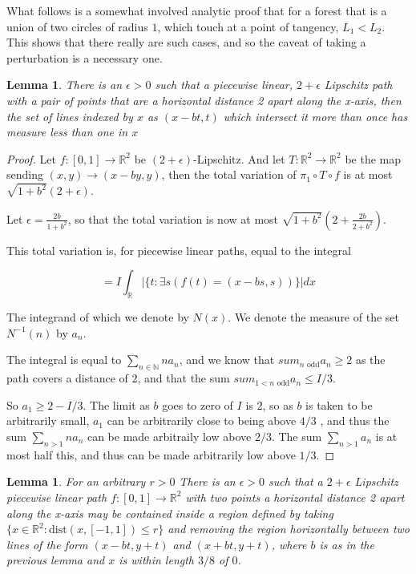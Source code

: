 \documentclass[10pt,a4paper]{article}
\newtheorem{lem}[thm]{Lemma}          %
\theoremstyle{definition}
\newcommand{\N}{\mathbb{N}}
\def\R{\mathbb{R}}
\begin{document}
What follows is a somewhat involved analytic proof that for a forest that is a union of two circles of radius $1$, which touch at a point of tangency, $L_1 < L_2$. This shows that there really are such cases, and so the caveat of taking a perturbation is a necessary one.

\begin{lem}
There is an $\epsilon > 0$ such that a piecewise linear, $2+\epsilon$ Lipschitz path with a pair of points that are a horizontal distance 2 apart along the x-axis, then the set of lines indexed by $x$ as $(x-bt,t)$ which intersect it more than once has measure less than one in $x$
\end{lem}
\label{lem:linebound}

\begin{proof}
    Let $f:[0,1]\rightarrow \R^2$ be $(2+\epsilon)$-Lipschitz. And let $T:\R^2\rightarrow \R^2$ be the map sending $(x,y)\rightarrow (x-by,y)$, then the total variation of $\pi_1\circ T\circ f$ is at most $\sqrt{1+b^2}(2+\epsilon)$.

Let $\epsilon = \frac{2b}{1+b^2}$, so that the total variation is now at most $\sqrt{1+b^2}(2+\frac{2b}{2+b^2})$.

This total variation is, for piecewise linear paths, equal to the integral

$$= I \int_\R |\{t:\exists s (f(t) = (x-bs,s)) \}|dx$$

The integrand of which we denote by $N(x)$. We denote the measure of the set $N^{-1}(n)$ by $a_n$.

The integral is equal to $\sum_{n\in\N}na_n$, and we know that $sum_{n \text{ odd}}a_n \geq 2$ as the path covers a distance of $2$, and that the sum $sum_{1 < n \text{ odd}}a_n \leq I/3$.

So $a_1 \geq 2 - I/3$. The limit as $b$ goes to zero of $I$ is $2$, so as $b$ is taken to be arbitrarily small, $a_1$ can be arbitrarily close to being above $4/3$ , and thus the sum $\sum_{n > 1}na_n$ can be made arbitraily low above $2/3$. The sum $\sum_{n > 1}a_n$ is at most half this, and thus can be made arbitrarily low above $1/3$.
\end{proof}

\begin{lem}
    For an arbitrary $r> 0$ There is an $\epsilon > 0$ such that a $2+\epsilon$ Lipschitz piecewise linear path $f:[0,1]\rightarrow \R^2$ with two points a horizontal distance 2 apart along the x-axis may be contained inside a region defined by taking $\{x\in\R^2: \mathrm{dist}(x,[-1,1]) \leq r\}$ and removing the region horizontally between two lines of the form $(x-bt,y+t)$ and $(x+bt,y+t)$, where $b$ is as in the previous lemma and $x$ is within length $3/8$ of $0$.
\end{lem}
\label{lem:outbound}
\end{document}
